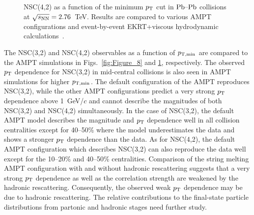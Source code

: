\begin{figure}[t!]
             \begin{center}
              \end{center}
             \caption{NSC(4,2) as a function of the minimum $p_{\rm T}$ cut in $\textnormal{Pb--Pb}$ collisions at $\sqrt{s_{\textnormal{NN}}}=2.76$~TeV. Results are compared to various AMPT configurations and event-by-event EKRT+viscous hydrodynamic calculations~\cite{Niemi:2015qia}.}
             \label{fig:Figure_9}
\end{figure}

The NSC(3,2) and NSC(4,2) observables as a function of $p_{\rm T, min}$ are compared to the {AMPT} simulations in Figs.~\ref{fig:Figure_8} and \ref{fig:Figure_9}, respectively.
The observed $p_{\rm T}$ dependence for NSC(3,2) in mid-central collisions is also seen in AMPT simulations for higher $p_{\rm T, min}$.
The default configuration of the AMPT reproduces NSC(3,2), while the other AMPT configurations predict a very strong $p_{\rm T}$ dependence above 1~GeV/$c$ and cannot describe the magnitudes of both NSC(3,2) and NSC(4,2) simultaneously.
In the case of NSC(3,2), the default AMPT model describes the magnitude and $p_{\rm T}$ dependence well in all collision centralities except for 40--50\% where the model underestimates the data and shows a stronger $p_{\rm T}$ dependence than the data.
As for  NSC(4,2), the default AMPT configuration which describes NSC(3,2) can also reproduce the data well except for the 10--20\% and 40--50\% centralities.
Comparison of the string melting AMPT configuration with and without hadronic rescattering suggests that a very strong $p_{\rm T}$ dependence as well as the correlation strength are weakened by the hadronic rescattering.
Consequently, the observed weak $p_{\rm T}$ dependence may be due to hadronic rescattering. The relative contributions to the final-state particle distributions from partonic and hadronic stages need further study.

